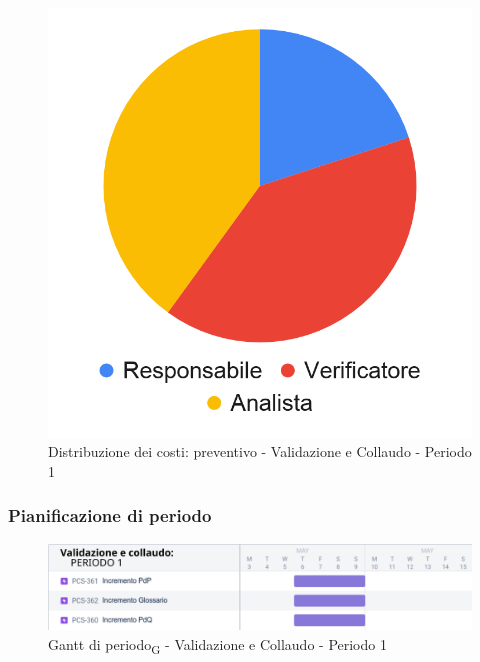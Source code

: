 \hspace{-1cm}
\begin{minipage}{.50\textwidth}
\smallPreventivoTable{
	
}
\end{minipage}
\hspace{1cm}
\begin{minipage}{.40\textwidth}
\begin{figure}[H]
	\includegraphics[scale=0.21]{res/images/charts/preventivo_priori/Grafico4-9.png}
	\caption{Distribuzione dei costi: preventivo - Validazione e Collaudo - Periodo 1}
\end{figure}
\end{minipage} 





\subsubsection{Pianificazione di periodo}


\begin{figure}[H]
	\centering
	\includegraphics[scale=0.55]{res/images/gantt_periodo/valid_1_gantt.png}
	\caption{Gantt di periodo\textsubscript{G} - Validazione e Collaudo - Periodo 1}
\end{figure}

